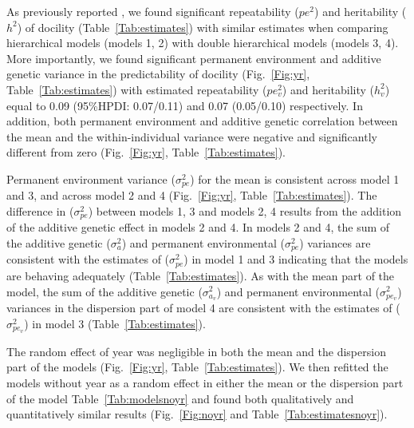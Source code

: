 \documentclass[a4paper,12pt,twoside]{article}
\begin{document}
	As previously reported \citep{Petelle2015}, we found significant repeatability ($pe^2$) and heritability ($h^2$) of docility (Table~\ref{Tab:estimates}) with similar estimates when comparing hierarchical models (models 1, 2) with double hierarchical models (models 3, 4).
	More importantly, we found significant permanent environment and additive genetic variance in the predictability of docility (Fig.~\ref{Fig:yr}, Table~\ref{Tab:estimates}) with estimated repeatability ($pe_v^2$) and heritability ($h_v^2$) equal to 0.09 (95\%HPDI: 0.07/0.11) and 0.07 (0.05/0.10) respectively.
	In addition, both permanent environment and additive genetic correlation between the mean and the within-individual variance were negative and significantly different from zero (Fig.~\ref{Fig:yr}, Table~\ref{Tab:estimates}).
	
	Permanent environment variance ($\sigma_{pe}^2$) for the mean is consistent across model 1 and 3, and across model 2 and 4 (Fig.~\ref{Fig:yr}, Table~\ref{Tab:estimates}).
	The difference in ($\sigma_{pe}^2$) between models 1, 3 and models 2, 4 results from the addition of the additive genetic effect in models 2 and 4.
	In models 2 and 4, the sum of the additive genetic ($\sigma_{a}^2$) and permanent environmental ($\sigma_{pe}^2$) variances are consistent with the estimates of ($\sigma_{pe}^2$) in model 1 and 3 indicating that the models are behaving adequately (Table~\ref{Tab:estimates}).
	As with the mean part of the model, the sum of the additive genetic ($\sigma_{a_v}^2$) and permanent environmental ($\sigma_{pe_v}^2$) variances in the dispersion part of model 4 are consistent with the estimates of ($\sigma_{pe_v}^2$) in model 3 (Table~\ref{Tab:estimates}).
	
	The random effect of year was negligible in both the mean and the dispersion part of the models (Fig.~\ref{Fig:yr}, Table~\ref{Tab:estimates}).
	We then refitted the models without year as a random effect in either the mean or the dispersion part of the model Table~\ref{Tab:modelsnoyr} and found both qualitatively and quantitatively similar results (Fig.~\ref{Fig:noyr} and Table~\ref{Tab:estimatesnoyr}).
	
\end{document}
